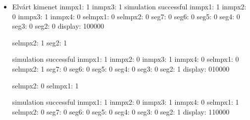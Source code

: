 \begin{itemize}
\item Elvárt kimenet\newline
inmpx1: 1\newline
inmpx3: 1\newline
simulation successful
inmpx1: 1\newline
inmpx2: 0\newline
inmpx3: 1\newline
inmpx4: 0\newline
selmpx1: 0\newline
selmpx2: 0\newline
seg7: 0\newline
seg6: 0\newline
seg5: 0\newline
seg4: 0\newline
seg3: 0\newline
seg2: 0\newline
display: 100000\newline

selmpx2: 1\newline
seg2: 1\newline

simulation successful\newline
inmpx1: 1\newline
inmpx2: 0\newline
inmpx3: 1\newline
inmpx4: 0\newline
selmpx1: 0\newline
selmpx2: 1\newline
seg7: 0\newline
seg6: 0\newline
seg5: 0\newline
seg4: 0\newline
seg3: 0\newline
seg2: 1\newline
display: 010000\newline

selmpx2: 0\newline
selmpx1: 1\newline

simulation successful\newline
inmpx1: 1\newline
inmpx2: 0\newline
inmpx3: 1\newline
inmpx4: 0\newline
selmpx1: 1\newline
selmpx2: 0\newline
seg7: 0\newline
seg6: 0\newline
seg5: 0\newline
seg4: 0\newline
seg3: 0\newline
seg2: 1\newline
display: 110000\newline
\end{itemize}

